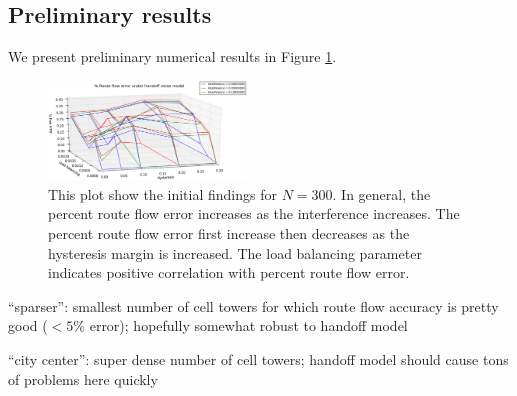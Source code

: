 \subsection{Preliminary results}

We present preliminary numerical results in Figure \ref{fig:results1}.

\begin{figure}[h!]
  \centering
    \includegraphics[width=0.47\textwidth]{figures/results_300_hysteresis.png}
  \caption{\footnotesize{This plot show the initial findings for $N=300$. In general, the percent route flow error increases as the interference increases. The percent route flow error first increase then decreases as the hysteresis margin is increased. The load balancing parameter indicates positive correlation with percent route flow error.}}
  \label{fig:results1}
\end{figure}

“sparser”: smallest number of cell towers for which route flow accuracy is pretty good ($<5\%$ error); hopefully somewhat robust to handoff model

“city center”: super dense number of cell towers; handoff model should cause tons of problems here quickly

